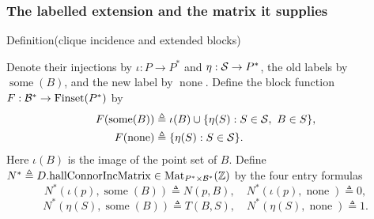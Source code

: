 \begin{mergedproofsection}
\subsubsection{The labelled extension and the matrix it supplies}

\begin{namedresult}{Definition}{(clique incidence and extended blocks)}\label{hc:def:extension}
 \leavevmode\par
 Denote their injections by $\iota:P\to P^*$ and $\eta:{\mathcal S}\to P^*$,
 the old labels by $\operatorname{some}(B)$, and the new label by $\operatorname{none}$.
 Define the block function $F:{\mathcal B}^*\to\operatorname{Finset}(P^*)$ by
 \[
 \begin{split}
 F(\operatorname{some}(B))&\triangleq
    \iota(B)\cup\{\eta(S):S\in{\mathcal S},\ B\in S\},\\
 F(\operatorname{none})&\triangleq\{\eta(S):S\in{\mathcal S}\}.
 \end{split}
 \]
 Here $\iota(B)$ is the image of the point set of $B$.
 Define $N^*\triangleq D.\mathrm{hallConnorIncMatrix}
 \in\mathrm{Mat}_{P^*\times {\mathcal B}^*}({\mathbb Z})$ by the four entry formulas
 \[
 N^*(\iota(p),\operatorname{some}(B))\triangleq N(p,B),\quad N^*(\iota(p),\operatorname{none})\triangleq0,
 \]
 \[
 N^*(\eta(S),\operatorname{some}(B))\triangleq T(B,S),\quad N^*(\eta(S),\operatorname{none})\triangleq1.
 \]
\end{namedresult}


\end{mergedproofsection}
